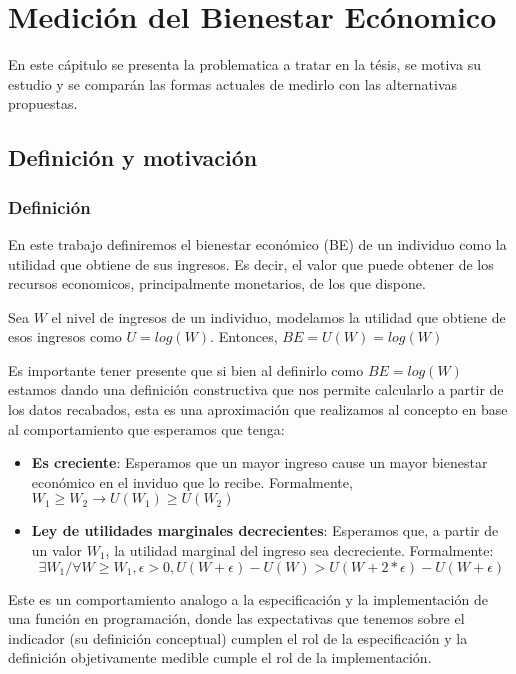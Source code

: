 \chapter{Medición del Bienestar Ecónomico} \label{chapter:mediciones_bienestar_economico}

En este cápitulo se presenta la problematica a tratar en la tésis, se motiva su estudio y se comparán las formas actuales de medirlo con las alternativas propuestas.

\section{Definición y motivación}

\subsection{Definición}

En este trabajo definiremos el bienestar económico (BE) de un individuo como la utilidad que obtiene de sus ingresos. Es decir, el valor que puede obtener de los recursos economicos, principalmente monetarios, de los que dispone.

Sea $W$ el nivel de ingresos de un individuo, modelamos la utilidad que obtiene de esos ingresos como $U = log(W)$. Entonces, $BE = U(W) = log(W)$

Es importante tener presente que si bien al definirlo como $BE = log(W)$ estamos dando una definición constructiva que nos permite calcularlo a partir de los datos recabados, esta es una aproximación que realizamos al concepto en base al comportamiento que esperamos que tenga:

\begin{itemize}
    \item \textbf{Es creciente}: Esperamos que un mayor ingreso cause un mayor bienestar económico en el inviduo que lo recibe. Formalmente, $W_1 \geq W_2 \rightarrow U(W_1) \geq U(W_2)$
    \item \textbf{Ley de utilidades marginales decrecientes}: Esperamos que, a partir de un valor $W_1$, la utilidad marginal del ingreso sea decreciente. Formalmente:
    $$
    \exists W_1 / \forall W \geq W_1, \epsilon > 0, U(W+\epsilon)-U(W) > U(W+2*\epsilon)-U(W+\epsilon)
    $$
\end{itemize}

Este es un comportamiento analogo a la especificación y la implementación de una función en programación, donde las expectativas que tenemos sobre el indicador (su definición conceptual) cumplen el rol de la especificación y la definición objetivamente medible cumple el rol de la implementación.

